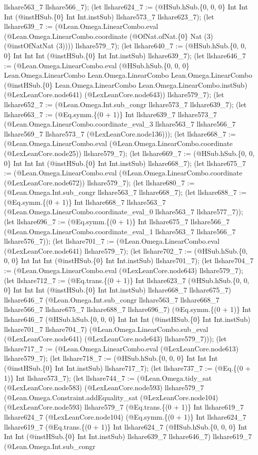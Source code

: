 \documentclass[11pt]{article}
\begin{document}
llshare563\_7 llshare566\_7); (let llshare624\_7 := (@HSub.hSub.\{0, 0, 0\} Int Int Int (@instHSub.\{0\} Int Int.instSub) llshare573\_7 llshare623\_7); (let llshare639\_7 := (@Lean.Omega.LinearCombo.eval (@Lean.Omega.LinearCombo.coordinate (@OfNat.ofNat.\{0\} Nat (3) (@instOfNatNat (3)))) llshare579\_7); (let llshare640\_7 := (@HSub.hSub.\{0, 0, 0\} Int Int Int (@instHSub.\{0\} Int Int.instSub) llshare639\_7); (let llshare646\_7 := (@Lean.Omega.LinearCombo.eval (@HSub.hSub.\{0, 0, 0\} Lean.Omega.LinearCombo Lean.Omega.LinearCombo Lean.Omega.LinearCombo (@instHSub.\{0\} Lean.Omega.LinearCombo Lean.Omega.LinearCombo.instSub) (@LexLeanCore.node641) (@LexLeanCore.node643)) llshare579\_7); (let llshare652\_7 := (@Lean.Omega.Int.sub\_congr llshare573\_7 llshare639\_7); (let llshare663\_7 := (@Eq.symm.\{(0 + 1)\} Int llshare639\_7 llshare573\_7 (@Lean.Omega.LinearCombo.coordinate\_eval\_3 llshare563\_7 llshare566\_7 llshare569\_7 llshare573\_7 (@LexLeanCore.node136))); (let llshare668\_7 := (@Lean.Omega.LinearCombo.eval (@Lean.Omega.LinearCombo.coordinate (@LexLeanCore.node25)) llshare579\_7); (let llshare669\_7 := (@HSub.hSub.\{0, 0, 0\} Int Int Int (@instHSub.\{0\} Int Int.instSub) llshare668\_7); (let llshare675\_7 := (@Lean.Omega.LinearCombo.eval (@Lean.Omega.LinearCombo.coordinate (@LexLeanCore.node672)) llshare579\_7); (let llshare680\_7 := (@Lean.Omega.Int.sub\_congr llshare563\_7 llshare668\_7); (let llshare688\_7 := (@Eq.symm.\{(0 + 1)\} Int llshare668\_7 llshare563\_7 (@Lean.Omega.LinearCombo.coordinate\_eval\_0 llshare563\_7 llshare577\_7)); (let llshare696\_7 := (@Eq.symm.\{(0 + 1)\} Int llshare675\_7 llshare566\_7 (@Lean.Omega.LinearCombo.coordinate\_eval\_1 llshare563\_7 llshare566\_7 llshare576\_7)); (let llshare701\_7 := (@Lean.Omega.LinearCombo.eval (@LexLeanCore.node641) llshare579\_7); (let llshare702\_7 := (@HSub.hSub.\{0, 0, 0\} Int Int Int (@instHSub.\{0\} Int Int.instSub) llshare701\_7); (let llshare704\_7 := (@Lean.Omega.LinearCombo.eval (@LexLeanCore.node643) llshare579\_7); (let llshare712\_7 := (@Eq.trans.\{(0 + 1)\} Int llshare623\_7 (@HSub.hSub.\{0, 0, 0\} Int Int Int (@instHSub.\{0\} Int Int.instSub) llshare668\_7 llshare675\_7) llshare646\_7 (@Lean.Omega.Int.sub\_congr llshare563\_7 llshare668\_7 llshare566\_7 llshare675\_7 llshare688\_7 llshare696\_7) (@Eq.symm.\{(0 + 1)\} Int llshare646\_7 (@HSub.hSub.\{0, 0, 0\} Int Int Int (@instHSub.\{0\} Int Int.instSub) llshare701\_7 llshare704\_7) (@Lean.Omega.LinearCombo.sub\_eval (@LexLeanCore.node641) (@LexLeanCore.node643) llshare579\_7))); (let llshare717\_7 := (@Lean.Omega.LinearCombo.eval (@LexLeanCore.node613) llshare579\_7); (let llshare718\_7 := (@HSub.hSub.\{0, 0, 0\} Int Int Int (@instHSub.\{0\} Int Int.instSub) llshare717\_7); (let llshare737\_7 := (@Eq.\{(0 + 1)\} Int llshare573\_7); (let llshare744\_7 := (@Lean.Omega.tidy\_sat (@LexLeanCore.node583) (@LexLeanCore.node593) llshare579\_7 (@Lean.Omega.Constraint.addEquality\_sat (@LexLeanCore.node104) (@LexLeanCore.node593) llshare579\_7 (@Eq.trans.\{(0 + 1)\} Int llshare619\_7 llshare624\_7 (@LexLeanCore.node104) (@Eq.symm.\{(0 + 1)\} Int llshare624\_7 llshare619\_7 (@Eq.trans.\{(0 + 1)\} Int llshare624\_7 (@HSub.hSub.\{0, 0, 0\} Int Int Int (@instHSub.\{0\} Int Int.instSub) llshare639\_7 llshare646\_7) llshare619\_7 (@Lean.Omega.Int.sub\_congr 
\end{document}
